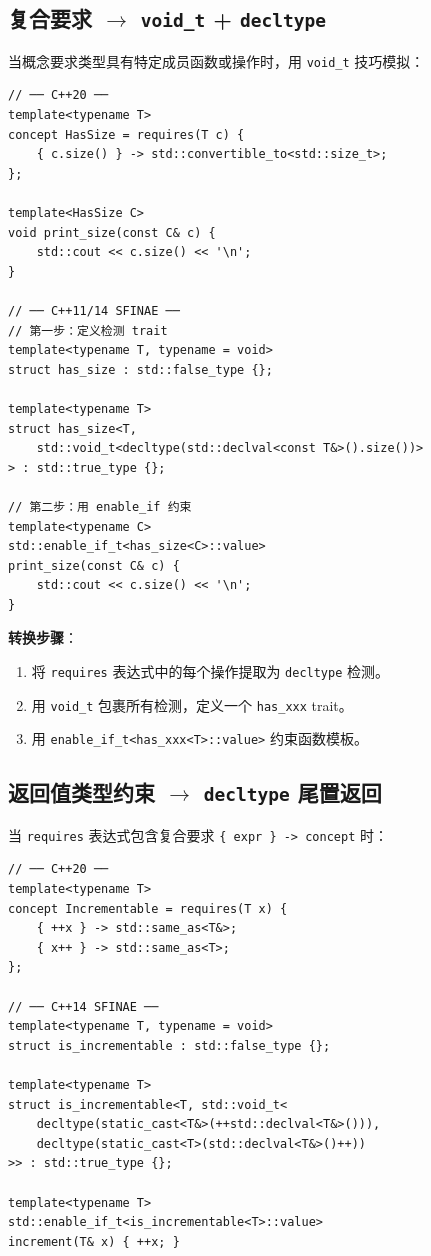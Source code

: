 \documentclass[12pt,a4paper,fontset=fandol]{ctexbook}
\begin{document}
\subsection{复合要求 $\to$ \texttt{void\_t} + \texttt{decltype}}

当概念要求类型具有特定成员函数或操作时，用 \texttt{void\_t} 技巧模拟：

\begin{lstlisting}
// ── C++20 ──
template<typename T>
concept HasSize = requires(T c) {
    { c.size() } -> std::convertible_to<std::size_t>;
};

template<HasSize C>
void print_size(const C& c) {
    std::cout << c.size() << '\n';
}

// ── C++11/14 SFINAE ──
// 第一步：定义检测 trait
template<typename T, typename = void>
struct has_size : std::false_type {};

template<typename T>
struct has_size<T,
    std::void_t<decltype(std::declval<const T&>().size())>
> : std::true_type {};

// 第二步：用 enable_if 约束
template<typename C>
std::enable_if_t<has_size<C>::value>
print_size(const C& c) {
    std::cout << c.size() << '\n';
}
\end{lstlisting}

\textbf{转换步骤}：
\begin{enumerate}[nosep]
  \item 将 \texttt{requires} 表达式中的每个操作提取为 \texttt{decltype} 检测。
  \item 用 \texttt{void\_t} 包裹所有检测，定义一个 \texttt{has\_xxx} trait。
  \item 用 \texttt{enable\_if\_t<has\_xxx<T>::value>} 约束函数模板。
\end{enumerate}

\subsection{返回值类型约束 $\to$ \texttt{decltype} 尾置返回}

当 \texttt{requires} 表达式包含复合要求 \texttt{\{ expr \} -> concept} 时：

\begin{lstlisting}
// ── C++20 ──
template<typename T>
concept Incrementable = requires(T x) {
    { ++x } -> std::same_as<T&>;
    { x++ } -> std::same_as<T>;
};

// ── C++14 SFINAE ──
template<typename T, typename = void>
struct is_incrementable : std::false_type {};

template<typename T>
struct is_incrementable<T, std::void_t<
    decltype(static_cast<T&>(++std::declval<T&>())),
    decltype(static_cast<T>(std::declval<T&>()++))
>> : std::true_type {};

template<typename T>
std::enable_if_t<is_incrementable<T>::value>
increment(T& x) { ++x; }
\end{lstlisting}
\end{document}
